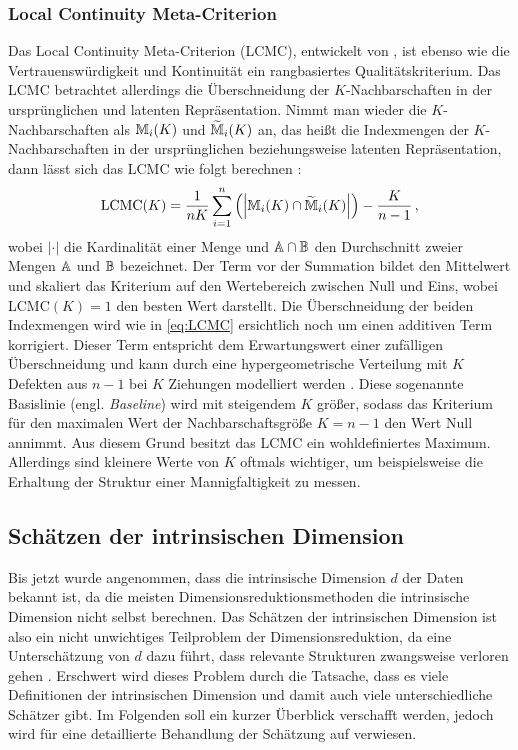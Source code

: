\subsubsection{Local Continuity Meta-Criterion}
\label{ch:Vergleich:sec:Methodik:subsec:Qualitaetskriterien:LCMC}
Das Local Continuity Meta-Criterion (LCMC), entwickelt von \textcite{Chen.2009}, ist ebenso wie die Vertrauenswürdigkeit und Kontinuität ein rangbasiertes Qualitätskriterium. Das LCMC betrachtet allerdings die Überschneidung der $K$-Nachbarschaften in der ursprünglichen und latenten Repräsentation. Nimmt man wieder die $K$-Nachbarschaften als $\mathbb{M}_i(K)$ und $\widetilde{\mathbb{M}}_i(K)$ an, das heißt die Indexmengen der $K$-Nachbarschaften in der ursprünglichen beziehungsweise latenten Repräsentation, dann lässt sich das LCMC wie folgt berechnen \parencite[212]{Chen.2009}:
\begin{equation}
	\label{eq:LCMC}
	\text{LCMC}(K) = \frac{1}{nK} \sum_{i=1}^{n} \left( \left| \mathbb{M}_i(K) \cap \widetilde{\mathbb{M}}_i(K) \right| \right) - \frac{K}{n - 1} \,,
\end{equation}
wobei $­|\cdot|$ die Kardinalität einer Menge und $\mathbb{A} \cap \mathbb{B}$ den Durchschnitt zweier Mengen $\mathbb{A}$ und $\mathbb{B}$ bezeichnet. Der Term vor der Summation bildet den Mittelwert und skaliert das Kriterium auf den Wertebereich zwischen Null und Eins, wobei LCMC$(K) = 1$ den besten Wert darstellt. Die Überschneidung der beiden Indexmengen wird wie in \eqref{eq:LCMC} ersichtlich noch um einen additiven Term korrigiert. Dieser Term entspricht dem Erwartungswert einer zufälligen Überschneidung und kann durch eine hypergeometrische Verteilung mit $K$ Defekten aus $n - 1$ bei $K$ Ziehungen modelliert werden \parencite[213]{Chen.2009}. Diese sogenannte Basislinie (engl. \textit{Baseline}) wird mit steigendem
$K$ größer, sodass das Kriterium für den maximalen Wert der Nachbarschaftsgröße $K = n - 1$ den
Wert Null annimmt. Aus diesem Grund besitzt das LCMC ein wohldefiniertes Maximum. Allerdings sind
kleinere Werte von $K$ oftmals wichtiger, um beispielsweise die Erhaltung der Struktur einer
Mannigfaltigkeit zu messen.

\subsection{Schätzen der intrinsischen Dimension}
\label{ch:Vergleich:sec:Methodik:subsec:SchaetzenDerIntrinsischenDim}

Bis jetzt wurde angenommen, dass die intrinsische Dimension $d$ der Daten bekannt ist, da die
meisten Dimensionsreduktionsmethoden die intrinsische Dimension nicht selbst berechnen. Das
Schätzen der intrinsischen Dimension ist also ein nicht unwichtiges Teilproblem der
Dimensionsreduktion, da eine Unterschätzung von $d$ dazu führt, dass relevante Strukturen
zwangsweise verloren gehen \parencite[1]{Levina.2004}. Erschwert wird dieses Problem durch die Tatsache, dass es viele
Definitionen der intrinsischen Dimension und damit auch viele unterschiedliche Schätzer gibt. Im
Folgenden soll ein kurzer Überblick verschafft werden, jedoch wird für eine detaillierte Behandlung
der Schätzung auf \textcites{Campadelli.2015}{Bac.2021}{Verveer.1995} verwiesen.

